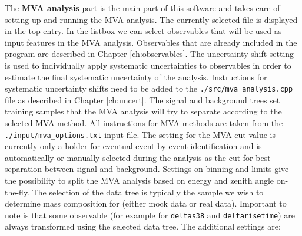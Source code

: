 \documentclass[12pt,a4paper]{report}
\begin{document}
The \textbf{MVA analysis} part is the main part of this software and takes care of setting up and running the MVA analysis. The currently selected file is displayed in the top entry. In the listbox we can select observables that will be used as input features in the MVA analysis. Observables that are already included in the program are described in Chapter \ref{ch:observables}. The uncertainty shift setting is used to individually apply systematic uncertainties to observables in order to estimate the final systematic uncertainty of the analysis. Instructions for systematic uncertainty shifts need to be added to the \texttt{./src/mva\_analysis.cpp} file as described in Chapter \ref{ch:uncert}. The signal and background trees set training samples that the MVA analysis will try to separate according to the selected MVA method. All instructions for MVA methods are taken from the \texttt{./input/mva\_options.txt} input file. The setting for the MVA cut value is currently only a holder for eventual event-by-event identification and is automatically or manually selected during the analysis as the cut for best separation between signal and background. Settings on binning and limits give the possibility to split the MVA analysis based on energy and zenith angle on-the-fly. The selection of the data tree is typically the sample we wish to determine mass composition for (either mock data or real data). Important to note is that some observable (for example for \texttt{deltas38} and \texttt{deltarisetime}) are always transformed using the selected data tree. The additional settings are:
\end{document}
